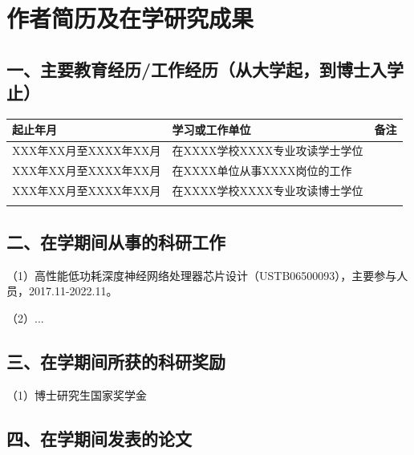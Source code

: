 \chapter*{作者简历及在学研究成果}

\section*{一、主要教育经历/工作经历（从大学起，到博士入学止）}


\noindent\renewcommand{\arraystretch}{0.9}
\noindent\begin{tabularx}{\textwidth}{|>{\centering\arraybackslash}X|>{\centering\arraybackslash}X|>{\centering\arraybackslash}X|}
  \hline
  起止年月 & 学习或工作单位 & 备注 \\\hline 
  XXX年XX月至XXXX年XX月  & 在XXXX学校XXXX专业攻读学士学位  &    \\\hline
  XXX年XX月至XXXX年XX月  & 在XXXX单位从事XXXX岗位的工作  &    \\\hline
  XXX年XX月至XXXX年XX月  & 在XXXX学校XXXX专业攻读博士学位  &    \\\hline
  & & \\ \hline
\end{tabularx}

\section*{二、在学期间从事的科研工作}

（1）高性能低功耗深度神经网络处理器芯片设计（USTB06500093），主要参与人员，2017.11-2022.11。

（2）... 

\section*{三、在学期间所获的科研奖励}

（1）博士研究生国家奖学金

\section*{四、在学期间发表的论文}

